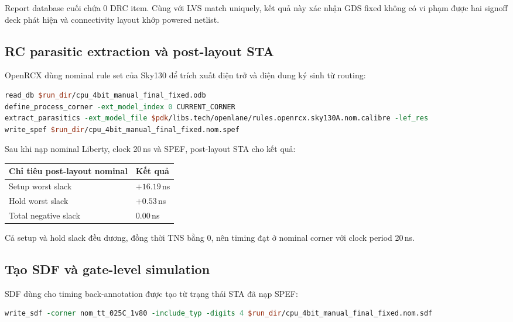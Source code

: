 \documentclass[12pt,a4paper]{article}
\begin{document}
Report database cuối chứa 0 DRC item. Cùng với LVS match uniquely, kết
quả này xác nhận GDS fixed không có vi phạm được hai signoff deck phát
hiện và connectivity layout khớp powered netlist.

\subsection{RC parasitic extraction và post-layout STA}

OpenRCX dùng nominal rule set của Sky130 để trích xuất điện trở và điện
dung ký sinh từ routing:

\begin{lstlisting}[language=tcl]
read_db $run_dir/cpu_4bit_manual_final_fixed.odb
define_process_corner -ext_model_index 0 CURRENT_CORNER
extract_parasitics -ext_model_file $pdk/libs.tech/openlane/rules.openrcx.sky130A.nom.calibre -lef_res
write_spef $run_dir/cpu_4bit_manual_final_fixed.nom.spef
\end{lstlisting}

Sau khi nạp nominal Liberty, clock 20\,ns và SPEF, post-layout STA cho kết
quả:

\begin{longtable}{>{\raggedright\arraybackslash}p{}
                  >{\raggedleft\arraybackslash}p{}}
\toprule
\textbf{Chỉ tiêu post-layout nominal} & \textbf{Kết quả} \\
\midrule
\endhead
Setup worst slack & $+16.19$\,ns \\
Hold worst slack & $+0.53$\,ns \\
Total negative slack & $0.00$\,ns \\
\bottomrule
\end{longtable}

Cả setup và hold slack đều dương, đồng thời TNS bằng 0, nên timing đạt ở
nominal corner với clock period 20\,ns.

\subsection{Tạo SDF và gate-level simulation}

SDF dùng cho timing back-annotation được tạo từ trạng thái STA đã nạp
SPEF:

\begin{lstlisting}[language=tcl]
write_sdf -corner nom_tt_025C_1v80 -include_typ -digits 4 $run_dir/cpu_4bit_manual_final_fixed.nom.sdf
\end{lstlisting}
\end{document}
